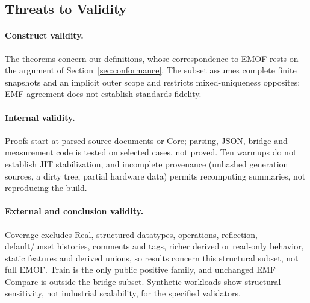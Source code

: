 \subsection{Threats to Validity}
\paragraph{Construct validity.}
The theorems concern our definitions, whose correspondence to EMOF rests on the
argument of Section~\ref{sec:conformance}. The subset assumes complete finite
snapshots and an implicit outer scope and restricts mixed-uniqueness opposites;
EMF agreement does not establish standards fidelity.

\paragraph{Internal validity.}
Proofs start at parsed source documents or Core; parsing, JSON, bridge and
measurement code is tested on selected cases, not proved. Ten warmups do not
establish JIT stabilization, and incomplete provenance (unhashed generation
sources, a dirty tree, partial hardware data) permits recomputing summaries, not
reproducing the build.

\paragraph{External and conclusion validity.}
Coverage excludes Real, structured datatypes, operations, reflection,
default/unset histories, comments and tags, richer derived or read-only
behavior, static features and derived unions, so results concern this structural
subset, not full EMOF. Train is the only public positive family, and unchanged
EMF Compare is outside the bridge subset. Synthetic workloads show structural
sensitivity, not industrial scalability, for the specified validators.
